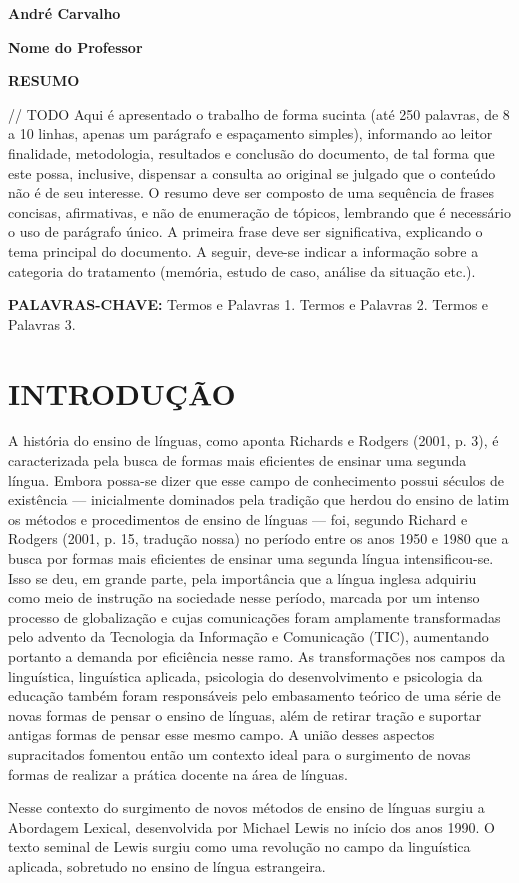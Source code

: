 \documentclass[        
    a4paper,          %
    12pt,             %
    section=TITLE,    %
    subsection=Title, %
    oneside,          %
    english,          %
    spanish,          %
    brazil,           %
    fleqn             %
]{abntex2}
\begin{document}
	

  \begin{flushright}
    \textbf{André Carvalho}

    \textbf{Nome do Professor}
  \end{flushright}

  \begin{center}
      \Large \textbf{RESUMO}
  \end{center}

  \noindent // TODO Aqui é apresentado o trabalho de forma sucinta (até 250 palavras, de 8 a 10 linhas, apenas um parágrafo e espaçamento simples), informando ao leitor finalidade, metodologia, resultados e conclusão do documento, de tal forma que este possa, inclusive, dispensar a consulta ao original se julgado que o conteúdo não é de seu interesse. O resumo deve ser composto de uma sequência de frases concisas, afirmativas, e não de enumeração de tópicos, lembrando que é necessário o uso de parágrafo único. A primeira frase deve ser significativa, explicando o tema principal do documento. A seguir, deve-se indicar a informação sobre a categoria do tratamento (memória, estudo de caso, análise da situação etc.).

  \noindent \textbf{PALAVRAS-CHAVE:} Termos e Palavras 1. Termos e Palavras 2. Termos e Palavras 3.

  \section{INTRODUÇÃO}

  A história do ensino de línguas, como aponta Richards e Rodgers (2001, p. 3), é caracterizada pela busca de formas mais eficientes de ensinar uma segunda língua. Embora possa-se dizer que esse campo de conhecimento possui séculos de existência — inicialmente dominados pela tradição que herdou do ensino de latim os métodos e procedimentos de ensino de línguas — foi, segundo Richard e Rodgers (2001, p. 15, tradução nossa) no período entre os anos 1950 e 1980 que a busca por formas mais eficientes de ensinar uma segunda língua intensificou-se. Isso se deu, em grande parte, pela importância que a língua inglesa adquiriu como meio de instrução na sociedade nesse período, marcada por um intenso processo de globalização e cujas comunicações foram amplamente transformadas pelo advento da Tecnologia da Informação e Comunicação (TIC), aumentando portanto a demanda por eficiência nesse ramo. As transformações nos campos da linguística, linguística aplicada, psicologia do desenvolvimento e psicologia da educação também foram responsáveis pelo embasamento teórico de uma série de novas formas de pensar o ensino de línguas, além de retirar tração e suportar antigas formas de pensar esse mesmo campo. A união desses aspectos supracitados fomentou então um contexto ideal para o surgimento de novas formas de realizar a prática docente na área de línguas. 

  Nesse contexto do surgimento de novos métodos de ensino de línguas surgiu a Abordagem Lexical, desenvolvida por Michael Lewis no início dos anos 1990. O texto seminal de Lewis surgiu como uma revolução no campo da linguística aplicada, sobretudo no ensino de língua estrangeira.
\end{document}

